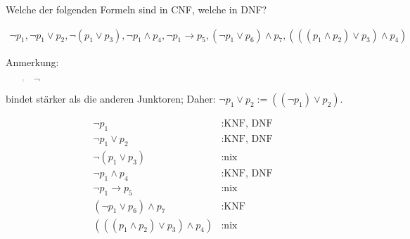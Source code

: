 
\begin{exercise}[30]

Welche der folgenden Formeln sind in CNF, welche in DNF?

\begin{align*}
    \neg p_1,
    \neg p_1 \lor p_2,
    \neg (p_1 \lor p_3),
    \neg p_1 \land p_4,
    \neg p_1 \to p_5,
    (\neg p_1 \lor p_6) \land p_7,
    (((p_1 \land p_2) \lor p_3) \land p_4)
\end{align*}

Anmerkung:
\blockquote{$\neg$} bindet stärker als die anderen Junktoren;
Daher:
$\neg p_1 \lor p_2 := ((\neg p_1) \lor p_2)$.

\end{exercise}


\begin{solution}

\phantom{}


\begin{align*}
    \neg p_1 &: \text{KNF, DNF} \\
    \neg p_1 \lor p_2 &: \text{KNF, DNF} \\
    \neg (p_1 \lor p_3) &: \text{nix} \\
    \neg p_1 \land p_4 &: \text{KNF, DNF} \\
    \neg p_1 \to p_5 &: \text{nix} \\
    (\neg p_1 \lor p_6) \land p_7 &: \text{KNF} \\
    (((p_1 \land p_2) \lor p_3) \land p_4) &: \text{nix}
\end{align*}

\end{solution}

